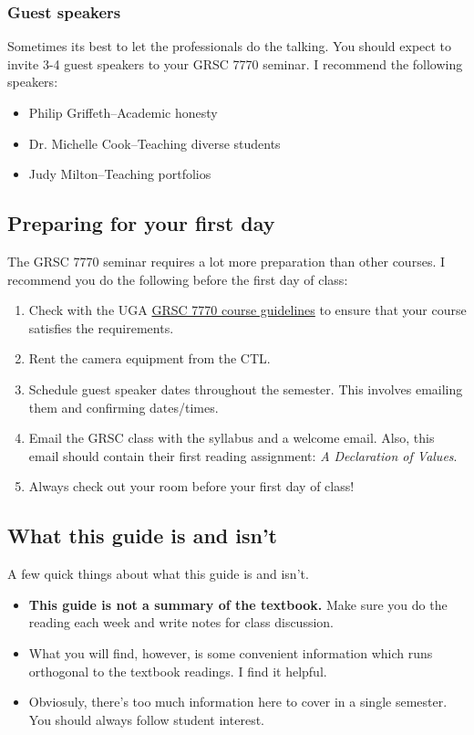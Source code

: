 \subsubsection{Guest speakers}
\label{sec:guest-speakers}

Sometimes its best to let the professionals do the talking.  You should expect to invite 3-4 guest speakers to your GRSC 7770 seminar.  I recommend the following speakers:
\begin{itemize}
\item Philip Griffeth--Academic honesty
\item Dr. Michelle Cook--Teaching diverse students
\item Judy Milton--Teaching portfolios
\end{itemize}



\subsection{Preparing for your first day}
\label{sec:preparing-your-first}

The GRSC 7770 seminar requires a lot more preparation than other courses.  I recommend you do the following before the first day of class:

\begin{enumerate}
\item Check with the UGA \href{https://github.com/WilliamOlsen/GRSC-2018/blob/master/Lectures/Week-0/GRSC7770-Guidelines-2018.pdf}{GRSC 7770 course guidelines} to ensure that your course satisfies the requirements.
\item Rent the camera equipment from the CTL.
\item Schedule guest speaker dates throughout the semester.  This involves emailing them and confirming dates/times.
\item Email the GRSC class with the syllabus and a welcome email.  Also, this email should contain their first reading assignment: \emph{A Declaration of Values}. 
\item Always check out your room before your first day of class! 
\end{enumerate}

\subsection{What this guide is and isn't}
\label{sec:structure-this-guide}

A few quick things about what this guide is and isn't.
\begin{itemize}
\item \textbf{This guide is not a summary of the textbook.}  Make sure you do the reading each week and write notes for class discussion.
\item What you will find, however, is some convenient information which runs orthogonal to the textbook readings.  I find it helpful.
\item Obviosuly, there's too much information here to cover in a single semester.  You should always follow student interest.
\end{itemize}


